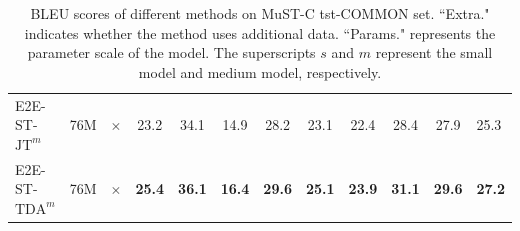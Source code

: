 \documentclass[letterpaper]{article} %
\begin{document}
\begin{table}[htb]
{{\begin{tabular}{l|c|c|cccccccc|l}
            E2E-ST-$\text{JT}^{m}$   &  76M     & $\times$      & 23.2 & 34.1 & 14.9 & 28.2 & 23.1 & 22.4 & 28.4 & 27.9 & 25.3  \\
            E2E-ST-$\text{TDA}^{m}$      &   76M      & $\times$ & \textbf{25.4} & \textbf{36.1} & \textbf{16.4} & \textbf{29.6} & \textbf{25.1} & \textbf{23.9} & \textbf{31.1}           & \textbf{29.6} & \textbf{27.2}     \\
            \bottomrule
            \hline
        \end{tabular}}}
    \caption{BLEU scores of different methods on MuST-C tst-COMMON set. ``Extra." indicates whether the method uses additional data. ``Params." represents the parameter scale of the model. The superscripts $s$ and $m$ represent the small model and medium model, respectively.}
    \label{tab:main_results_bleu}
\end{table}

\begin{table}[htb]
    \small
    \normalsize
    \centering
    \caption{WER scores of different methods on Must-C tst-COMMON set.}
    \label{tab:main_results_wer}
\end{table}
\end{document}
